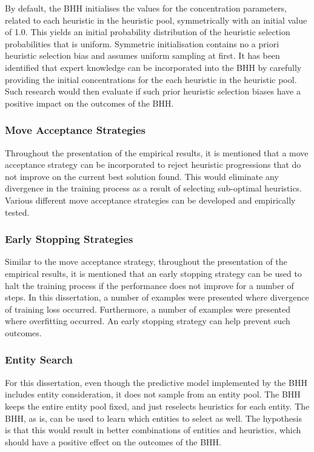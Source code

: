 By default, the \acs{BHH} initialises the values for the concentration parameters, related to each heuristic in the heuristic pool, symmetrically with an initial value of 1.0. This yields an initial probability distribution of the heuristic selection probabilities that is uniform. Symmetric initialisation contains no a priori heuristic selection bias and assumes uniform sampling at first. It has been identified that expert knowledge can be incorporated into the \acs{BHH} by carefully providing the initial concentrations for the each heuristic in the heuristic pool. Such research would then evaluate if such prior heuristic selection biases have a positive impact on the outcomes of the \acs{BHH}.

\subsubsection{Move Acceptance Strategies}
\label{sec:conclusion:further_research:move_acceptance}

Throughout the presentation of the empirical results, it is mentioned that a move acceptance strategy can be incorporated to reject heuristic progressions that do not improve on the current best solution found. This would eliminate any divergence in the training process as a result of selecting sub-optimal heuristics. Various different move acceptance strategies can be developed and empirically tested.

\subsubsection{Early Stopping Strategies}
\label{sec:conclusion:further_research:early_stopping}

Similar to the move acceptance strategy, throughout the presentation of the empirical results, it is mentioned that an early stopping strategy can be used to halt the training process if the performance does not improve for a number of steps. In this dissertation, a number of examples were presented where divergence of training loss occurred. Furthermore, a number of examples were presented where overfitting occurred. An early stopping strategy can help prevent such outcomes.

\subsubsection{Entity Search}
\label{sec:conclusion:further_research:entity_search}
For this dissertation, even though the predictive model implemented by the \acs{BHH} includes entity consideration, it does not sample from an entity pool. The \acs{BHH} keeps the entire entity pool fixed, and just reselects heuristics for each entity. The \acs{BHH}, as is, can be used to learn which entities to select as well. The hypothesis is that this would result in better combinations of entities and heuristics, which should have a positive effect on the outcomes of the \acs{BHH}.

